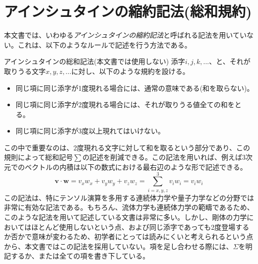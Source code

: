 \section{アインシュタインの縮約記法(総和規約)}
本文書では、いわゆる\emph{アインシュタインの縮約記法}と呼ばれる記法を用いていない。これは、以下のようなルールで記述を行う方法である。
\begin{definition*}{アインシュタインの総和記法(本文書では使用しない)}
	添字\(i,j,k,...\)、と、それが取りうる文字\(x,y,z,...\)に対し、以下のような規約を設ける。
	\begin{itemize}
		\item{同じ項に同じ添字が1度現れる場合には、通常の意味である(和を取らない)。}
		\item{同じ項に同じ添字が2度現れる場合には、それが取りうる値全ての和をとる。}
		\item{同じ項に同じ添字が3度以上現れてはいけない。}
	\end{itemize}
\end{definition*}
この中で重要なのは、2度現れる文字に対して和を取るという部分であり、この規則によって総和記号\(\sum\)の記述を削減できる。この記法を用いれば、例えば3次元でのベクトルの内積は以下の数式における最右辺のような形で記述できる。
\begin{equation}
	\boldsymbol{v}\cdot\boldsymbol{w}= v_x w_x +v_y w_y+ v_z w_z=\sum_{i=x,y,z}^3{v_{i}w_{i}}={v_{i}w_{i}}
\end{equation}
この記法は、特にテンソル演算を多用する連続体力学や量子力学などの分野では非常に有効な記法である。もちろん、流体力学も連続体力学の範疇であるため、このような記法を用いて記述している文書は非常に多い。しかし、剛体の力学においてはほとんど使用しないという点、および同じ添字であっても2度登場するか否かで意味が変わるため、初学者にとっては読みにくいと考えられるという点から、本文書ではこの記法を採用していない。項を足し合わせる際には、\(\Sigma\)を明記するか、または全ての項を書き下している。
